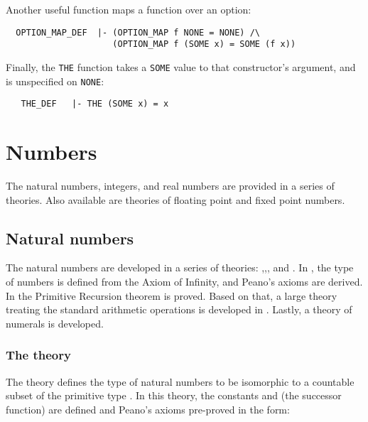 Another useful function maps a function over an option:
{\small
\begin{verbatim}
  OPTION_MAP_DEF  |- (OPTION_MAP f NONE = NONE) /\
                     (OPTION_MAP f (SOME x) = SOME (f x))
\end{verbatim}
}
Finally, the {\small\verb+THE+} function takes a {\small\verb+SOME+}
value to that constructor's argument, and is unspecified on
{\small\verb+NONE+}:
{\small
\begin{verbatim}
   THE_DEF   |- THE (SOME x) = x
\end{verbatim}
}

\section{Numbers}

The natural numbers, integers, and real numbers are provided in a
series of theories. Also available are theories of floating point and
fixed point numbers.

\subsection{Natural numbers}

The natural numbers are developed in a series of theories:
,,, and
\theoryimp{numeral}. In \theoryimp{num}, the type of numbers is
defined from the Axiom of Infinity, and Peano's axioms are derived. In
\theoryimp{prim\_rec} the Primitive Recursion theorem is proved. Based
on that, a large theory treating the standard arithmetic operations is
developed in \theoryimp{arithmetic}. Lastly, a theory of numerals is developed.

\subsubsection{The theory }

The theory 
defines the type \ml{num} of natural numbers to be
isomorphic to a countable subset of the primitive type .  In this
theory, the constants \ml{0}
and  (the successor function) are defined
and Peano's axioms
pre-proved in the form:

